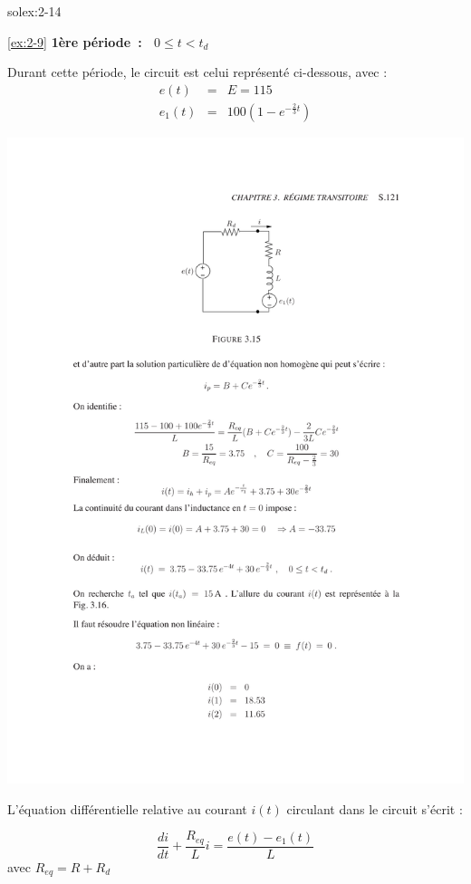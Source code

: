 \begin{exwithsol}{solex:2-14}
\begin{solexercise}{\ref{ex:2-9}}
{\bf 1\`ere p\'eriode~: \ $0\leq t < t_d$} 

Durant cette p\'eriode, le circuit est celui repr\'esent\'e ci-dessous, avec :
\begin{eqnarray*}
	e(t) &=&E = 115 \\
	e_1(t) &=& 100(1-e^{-\frac{2}{3}t}) 
\end{eqnarray*}
\begin{center}
	\includegraphics[width=\linewidth]{sol_exercices/ex3-9-1}
\end{center}

L'\'equation diff\'erentielle relative au courant $i(t)$ circulant dans le circuit s'\'ecrit :

\[\frac{di}{dt}+\frac{R_{eq}}{L}i=\frac{e(t)-e_1(t)}{L}\]
avec $R_{eq}=R+R_d$


\end{solexercise}
\end{exwithsol}

